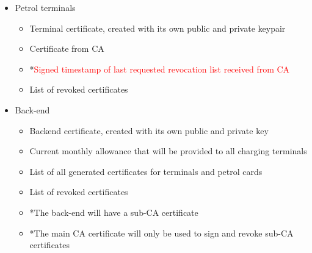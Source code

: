 \begin{itemize}
 
 \item Petrol terminals
 \begin{itemize}
  	\item Terminal certificate, created with its own public and private keypair
  	\item Certificate from CA
 	\item  *\textcolor{red}{Signed timestamp of last requested revocation list received from CA}
 	\item List of revoked certificates
 \end{itemize}

 \item Back-end
 \begin{itemize}
 	\item Backend certificate, created with its own public and private key
 	\item Current monthly allowance that will be provided to all charging terminals
 	\item List of all generated certificates for terminals and petrol cards
 	\item List of revoked certificates
 	\item *The back-end will have a sub-CA certificate
 	\item *The main CA certificate will only be used to sign and revoke sub-CA certificates
 \end{itemize}
\end{itemize}

